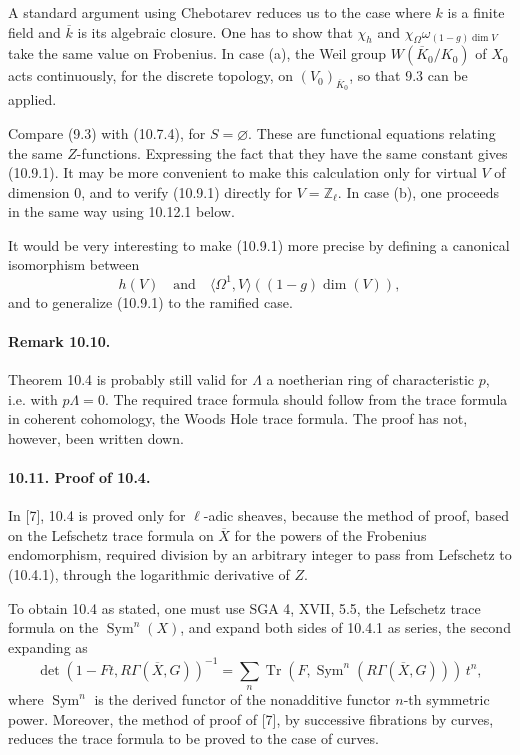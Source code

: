 \documentclass[10pt,letterpaper]{article}
\newcommand{\Z}{\mathbb Z}
\newcommand{\Tr}{\operatorname{Tr}}
\providecommand{\Tr}{\operatorname{Tr}}
\providecommand{\Tr}{\operatorname{Tr}}
\providecommand{\Sym}{\operatorname{Sym}}
\providecommand{\Tr}{\operatorname{Tr}}
\begin{document}
A standard argument using Chebotarev reduces us to the case where \(k\) is a finite field and \(\overline k\) is its algebraic closure. One has to show that \(\chi_h\) and \(\chi_{\Omega}\omega_{(1-g)\dim V}\) take the same value on Frobenius. In case (a), the Weil group \(W(\overline K_0/K_0)\) of \(X_0\) acts continuously, for the discrete topology, on \((V_0)_{\overline K_0}\), so that 9.3 can be applied.

Compare (9.3) with (10.7.4), for \(S=\varnothing\). These are functional equations relating the same \(Z\)-functions. Expressing the fact that they have the same constant gives (10.9.1). It may be more convenient to make this calculation only for virtual \(V\) of dimension \(0\), and to verify (10.9.1) directly for \(V=\Z_\ell\). In case (b), one proceeds in the same way using 10.12.1 below.

It would be very interesting to make (10.9.1) more precise by defining a canonical isomorphism between
\[
h(V)
\quad\text{and}\quad
\langle\Omega^1,V\rangle((1-g)\dim(V)),
\]
and to generalize (10.9.1) to the ramified case.

\paragraph{Remark 10.10.} Theorem 10.4 is probably still valid for \(\Lambda\) a noetherian ring of characteristic \(p\), i.e. with \(p\Lambda=0\). The required trace formula should follow from the trace formula in coherent cohomology, the Woods Hole trace formula. The proof has not, however, been written down.

\paragraph{10.11. Proof of 10.4.} In [7], 10.4 is proved only for \(\ell\)-adic sheaves, because the method of proof, based on the Lefschetz trace formula on \(\overline X\) for the powers of the Frobenius endomorphism, required division by an arbitrary integer to pass from Lefschetz to (10.4.1), through the logarithmic derivative of \(Z\).

To obtain 10.4 as stated, one must use SGA 4, XVII, 5.5, the Lefschetz trace formula on the \(\Sym^n(X)\), and expand both sides of 10.4.1 as series, the second expanding as
\[
\det(1-Ft,R\Gamma(\overline X,G))^{-1}
=
\sum_n \Tr(F,\Sym^n(R\Gamma(\overline X,G)))\,t^n,
\]
where \(\Sym^n\) is the derived functor of the nonadditive functor \(n\)-th symmetric power. Moreover, the method of proof of [7], by successive fibrations by curves, reduces the trace formula to be proved to the case of curves.
\end{document}
